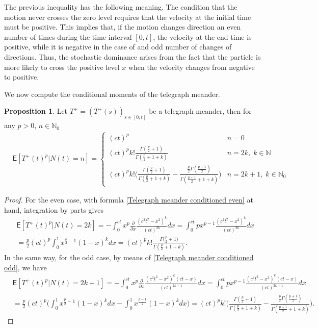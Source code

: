 \documentclass{article}
\theoremstyle{definition}
\newtheorem{proposition}{Proposition}[section]
\numberwithin{equation}{section}
\begin{document}
The previous inequality has the following meaning. The condition that the motion never crosses the zero level requires that the velocity at the initial time must be positive. This implies that, if the motion changes direction an even number of times during the time interval $[0,t]$, the velocity at the end time is positive, while it is negative in the case of and odd number of changes of directions. Thus, the stochastic dominance arises from the fact that the particle is more likely to cross the positive level $x$ when the velocity changes from negative to positive.

We now compute the conditional moments of the telegraph meander.
\begin{proposition}\label{proposition Telegraph meander conditioned moment}
Let $T^+ = (T^+(s))_{s \in [0,t]}$ be a telegraph meander, then for any $p>0$, $n \in \mathbb{N}_0$
\begin{align}\label{Telegraph meander conditioned moments}
&\mathsf{E}[T^+(t)^{p}|N(t) = n] =
\begin{cases}
(ct)^{p} &n=0\\
(ct)^{p}k!\frac{\Gamma(\frac{p}{2}+1)}{\Gamma(\frac{p}{2}+1+k)} &n = 2k,\;  k \in \mathbb{N} \\
(ct)^{p}k!\Big(\frac{\Gamma(\frac{p}{2}+1)}{\Gamma(\frac{p}{2}+1+k)}-\frac{\frac{p}{2}\Gamma(\frac{p+1}{2})}{\Gamma(\frac{p+1}{2}+1+k)}\Big) &n=2k+1,\; k \in \mathbb{N}_0
\end{cases}
\end{align}
\end{proposition}
\begin{proof}
For the even case, with formula \eqref{Telegraph meander conditioned even} at hand, integration by parts gives
\begin{align*} 
&\mathsf{E}[T^+(t)^{p}|N(t) = 2k] = -\int_0^{ct}x^p\frac{\partial}{\partial x}\frac{(c^2t^2-x^2)^{k}}{(ct)^{2k}}dx = \int_0^{ct}px^{p-1}\frac{(c^2t^2-x^2)^{k}}{(ct)^{2k}}dx \\&=\frac{p}{2}(ct)^{p}\int_0^{1}x^{\frac{p}{2}-1}(1-x)^{k}dx = (ct)^{p}k!\frac{\Gamma\Big(\frac{p}{2}+1\Big)}{\Gamma(\frac{p}{2}+1+k)}.
\end{align*}
In the same way, for the odd case, by means of \eqref{Telegraph meander conditioned odd}, we have
\begin{align*}
&\mathsf{E}[T^+(t)^{p}|N(t) = 2k+1] = -\int_0^{ct}x^p\frac{\partial}{\partial x}\frac{(c^2t^2-x^2)^{k}(ct-x)}{(ct)^{2k+1}}dx = \int_0^{ct}px^{p-1}\frac{(c^2t^2-x^2)^{k}(ct-x)}{(ct)^{2k+1}}dx \\&=\frac{p}{2}(ct)^{p}\bigg(\int_0^{1}x^{\frac{p}{2}-1}(1-x)^{k}dx-\int_0^{1}x^{\frac{p-1}{2}}(1-x)^{k}dx\bigg)=(ct)^{p}k!\bigg(\frac{\Gamma(\frac{p}{2}+1)}{\Gamma(\frac{p}{2}+1+k)}-\frac{\frac{p}{2}\Gamma(\frac{p+1}{2})}{\Gamma(\frac{p+1}{2}+1+k)}\bigg).
\end{align*}
\end{proof}
\end{document}
